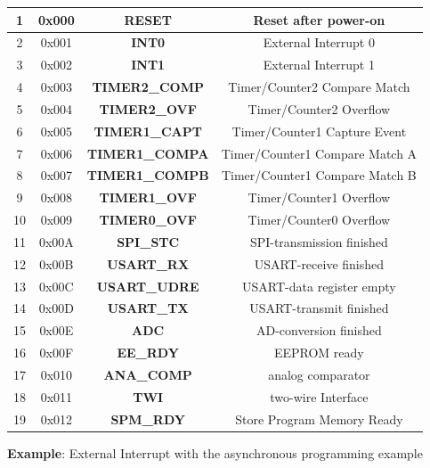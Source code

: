 \begin{table}[h!]
\setlength{\tabcolsep}{10pt} %
\renewcommand{\arraystretch}{1.5} %
\small
\centering
 \begin{tabular}{|c|c|c|c|}   
1  & 0x000  & \textbf{RESET } & Reset after power-on \\ \hline 
2  & 0x001  & \textbf{INT0 } & External Interrupt 0 \\ \hline 
3  & 0x002  & \textbf{INT1 } & External Interrupt 1 \\ \hline 
4  & 0x003  & \textbf{TIMER2\_COMP } & Timer/Counter2 Compare Match \\ \hline 
5  & 0x004  & \textbf{TIMER2\_OVF } & Timer/Counter2 Overflow \\ \hline 
6  & 0x005  & \textbf{TIMER1\_CAPT } & Timer/Counter1 Capture Event \\ \hline 
7  & 0x006  & \textbf{TIMER1\_COMPA } & Timer/Counter1 Compare Match A \\ \hline 
8  & 0x007  & \textbf{TIMER1\_COMPB } & Timer/Counter1 Compare Match B \\ \hline 
9  & 0x008  & \textbf{TIMER1\_OVF } & Timer/Counter1 Overflow \\ \hline 
10  & 0x009  & \textbf{TIMER0\_OVF } & Timer/Counter0 Overflow \\ \hline 
11  & 0x00A  & \textbf{SPI\_STC } & SPI-transmission finished \\ \hline 
12  & 0x00B  & \textbf{USART\_RX } & USART-receive finished \\ \hline 
13  & 0x00C  & \textbf{USART\_UDRE } & USART-data register empty \\ \hline 
14  & 0x00D  & \textbf{USART\_TX } & USART-transmit finished \\ \hline 
15  & 0x00E  & \textbf{ADC } & AD-conversion finished \\ \hline 
16  & 0x00F  & \textbf{EE\_RDY } & EEPROM ready \\ \hline 
17  & 0x010  & \textbf{ANA\_COMP } & analog comparator \\ \hline 
18  & 0x011  & \textbf{TWI } & two-wire Interface \\ \hline 
19  & 0x012  & \textbf{SPM\_RDY } & Store Program Memory Ready \\ \hline 
 \end{tabular}
 \label{}
\end{table}

\textbf{Example}: External Interrupt with the asynchronous programming example 


